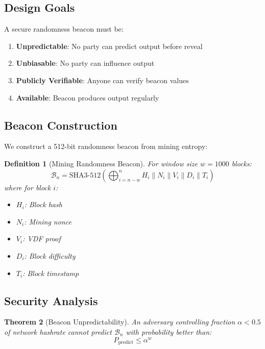 \documentclass[11pt,a4paper]{article}
\newtheorem{theorem}{Theorem}[section]
\newtheorem{definition}[theorem]{Definition}
\begin{document}
\subsection{Design Goals}

A secure randomness beacon must be:
\begin{enumerate}
    \item \textbf{Unpredictable}: No party can predict output before reveal
    \item \textbf{Unbiasable}: No party can influence output
    \item \textbf{Publicly Verifiable}: Anyone can verify beacon values
    \item \textbf{Available}: Beacon produces output regularly
\end{enumerate}

\subsection{Beacon Construction}

We construct a 512-bit randomness beacon from mining entropy:

\begin{definition}[Mining Randomness Beacon]
For window size $w = 1000$ blocks:
\begin{equation}
    \mathcal{B}_n = \text{SHA3-512}\left(
        \bigoplus_{i=n-w}^{n} H_i \| N_i \| V_i \| D_i \| T_i
    \right)
\end{equation}
where for block $i$:
\begin{itemize}
    \item $H_i$: Block hash
    \item $N_i$: Mining nonce
    \item $V_i$: VDF proof
    \item $D_i$: Block difficulty
    \item $T_i$: Block timestamp
\end{itemize}
\end{definition}

\subsection{Security Analysis}

\begin{theorem}[Beacon Unpredictability]
An adversary controlling fraction $\alpha < 0.5$ of network hashrate cannot predict $\mathcal{B}_n$ with probability better than:
\begin{equation}
    P_{\text{predict}} \leq \alpha^w
\end{equation}
\end{theorem}
\end{document}
